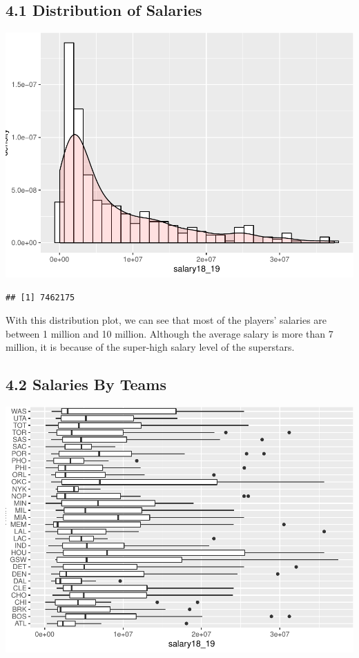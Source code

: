 \documentclass[]{article}
\begin{document}
\subsection{4.1 Distribution of
Salaries}\label{distribution-of-salaries}

\includegraphics{Final_Report_files/figure-latex/unnamed-chunk-13-1.pdf}

\begin{verbatim}
## [1] 7462175
\end{verbatim}

With this distribution plot, we can see that most of the players'
salaries are between 1 million and 10 million. Although the average
salary is more than 7 million, it is because of the super-high salary
level of the superstars.

\subsection{4.2 Salaries By Teams}\label{salaries-by-teams}

\includegraphics{Final_Report_files/figure-latex/unnamed-chunk-14-1.pdf}
\end{document}

